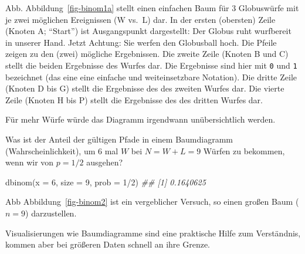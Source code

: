 \documentclass[
  a4paper,
  DIV=11]{scrreprt}
\newenvironment{Shaded}{\begin{snugshade}}{\end{snugshade}}
\newcommand{\AttributeTok}[1]{\textcolor[rgb]{0.40,0.45,0.13}{#1}}
\newcommand{\DecValTok}[1]{\textcolor[rgb]{0.68,0.00,0.00}{#1}}
\newcommand{\DocumentationTok}[1]{\textcolor[rgb]{0.37,0.37,0.37}{\textit{#1}}}
\newcommand{\FunctionTok}[1]{\textcolor[rgb]{0.28,0.35,0.67}{#1}}
\newcommand{\NormalTok}[1]{\textcolor[rgb]{0.00,0.23,0.31}{#1}}
\newcommand{\SpecialCharTok}[1]{\textcolor[rgb]{0.37,0.37,0.37}{#1}}
\theoremstyle{definition}
\theoremstyle{remark}
\begin{document}
Abb. Abbildung~\ref{fig-binom1a} stellt einen einfachen Baum für 3
Globuswürfe mit je zwei möglichen Ereignissen (W vs.~L) dar. In der
ersten (obersten) Zeile (Knoten A; ``Start'') ist Ausgangspunkt
dargestellt: Der Globus ruht wurfbereit in unserer Hand. Jetzt Achtung:
Sie werfen den Globusball hoch. Die Pfeile zeigen zu den (zwei) mögliche
Ergebnissen. Die zweite Zeile (Knoten B und C) stellt die beiden
Ergebnisse des Wurfes dar. Die Ergebnisse sind hier mit \texttt{0} und
\texttt{1} bezeichnet (das eine eine einfache und weiteinsetzbare
Notation). Die dritte Zeile (Knoten D bis G) stellt die Ergebnisse des
des zweiten Wurfes dar. Die vierte Zeile (Knoten H bis P) stellt die
Ergebnisse des des dritten Wurfes dar.

Für mehr Würfe würde das Diagramm irgendwann unübersichtlich werden.

Was ist der Anteil der gültigen Pfade in einem Baumdiagramm
(Wahrscheinlichkeit), um 6 mal \(W\) bei \(N=W+L=9\) Würfen zu bekommen,
wenn wir von \(p=1/2\) ausgehen?

\begin{Shaded}
\begin{Highlighting}[]
\FunctionTok{dbinom}\NormalTok{(}\AttributeTok{x =} \DecValTok{6}\NormalTok{, }\AttributeTok{size =} \DecValTok{9}\NormalTok{, }\AttributeTok{prob =} \DecValTok{1}\SpecialCharTok{/}\DecValTok{2}\NormalTok{)}
\DocumentationTok{\#\# [1] 0.1640625}
\end{Highlighting}
\end{Shaded}

Abb Abbildung~\ref{fig-binom2} ist ein vergeblicher Versuch, so einen
großen Baum (\(n=9\)) darzustellen.

\begin{tcolorbox}[enhanced jigsaw, leftrule=.75mm, left=2mm, bottomrule=.15mm, opacityback=0, coltitle=black, colbacktitle=quarto-callout-note-color!10!white, opacitybacktitle=0.6, rightrule=.15mm, toptitle=1mm, colback=white, colframe=quarto-callout-note-color-frame, arc=.35mm, toprule=.15mm, breakable, titlerule=0mm, bottomtitle=1mm, title=\textcolor{quarto-callout-note-color}{\faInfo}\hspace{0.5em}{Hinweis}]
Visualisierungen wie Baumdiagramme sind eine praktische Hilfe zum
Verständnis, kommen aber bei größeren Daten schnell an ihre Grenze.
\end{tcolorbox}
\end{document}
